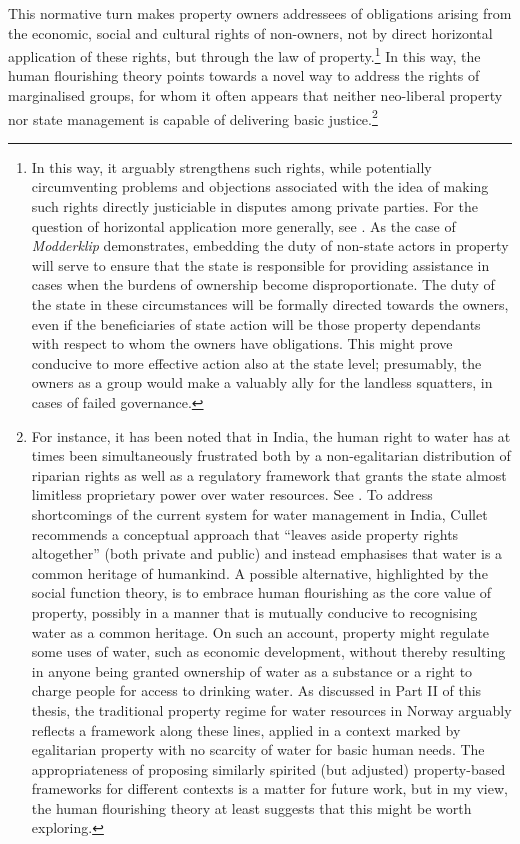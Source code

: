 This normative turn makes property owners addressees of obligations arising from the economic, social and cultural rights of non-owners, not by direct horizontal application of these rights, but through the law of property.\footnote{In this way, it arguably strengthens such rights, while potentially circumventing problems and objections associated with the idea of making such rights directly justiciable in disputes among private parties. For the question of horizontal application more generally, see \cite{manisuli07}. As the case of {\it Modderklip} demonstrates, embedding the duty of non-state actors in property will serve to ensure that the state is responsible for providing assistance in cases when the burdens of ownership become disproportionate. The duty of the state in these circumstances will be formally directed towards the owners, even if the beneficiaries of state action will be those property dependants with respect to whom the owners have obligations. This might prove conducive to more effective action also at the state level; presumably, the owners as a group would make a valuably ally for the landless squatters, in cases of failed governance.} In this way, the human flourishing theory points towards a novel way to address the rights of marginalised groups, for whom it often appears that neither neo-liberal property nor state management is capable of delivering basic justice.\footnote{For instance, it has been noted that in India, the human right to water has at times been simultaneously frustrated both by a non-egalitarian distribution of riparian rights as well as a regulatory framework that grants the state almost limitless proprietary power over water resources. See \cite[186]{cullet09}. To address shortcomings of the current system for water management in India, Cullet recommends a conceptual approach that ``leaves aside property rights altogether'' (both private and public) and instead emphasises that water is a common heritage of humankind. A possible alternative, highlighted by the social function theory, is to embrace human flourishing as the core value of property, possibly in a manner that is mutually conducive to recognising water as a common heritage. On such an account, property might regulate some uses of water, such as economic development, without thereby resulting in anyone being granted ownership of water as a substance or a right to charge people for access to drinking water. As discussed in Part II of this thesis, the traditional property regime for water resources in Norway arguably reflects a framework along these lines, applied in a context marked by egalitarian property with no scarcity of water for basic human needs. The appropriateness of proposing similarly spirited (but adjusted) property-based frameworks for different contexts is a matter for future work, but in my view, the human flourishing theory at least suggests that this might be worth exploring.}

